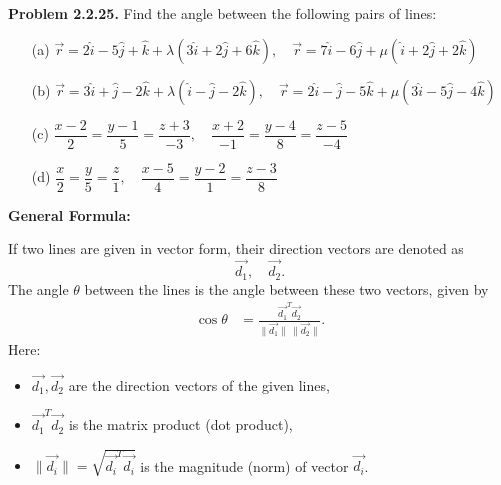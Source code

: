 \documentclass[12pt]{article}
\begin{document}
\textbf{Problem 2.2.25.} Find the angle between the following pairs of lines:

\begin{enumerate}
\item[(a)] 
$\vec{r} = 2\hat i - 5\hat j + \hat k + \lambda(3\hat i + 2\hat j + 6\hat k), 
\quad
\vec{r} = 7\hat i - 6\hat j + \mu(\hat i + 2\hat j + 2\hat k)$

\item[(b)] 
$\vec{r} = 3\hat i + \hat j - 2\hat k + \lambda(\hat i - \hat j - 2\hat k), 
\quad 
\vec{r} = 2\hat i - \hat j - 5\hat k + \mu(3\hat i - 5\hat j - 4\hat k)$

\item[(c)] 
$\dfrac{x-2}{2} = \dfrac{y-1}{5} = \dfrac{z+3}{-3}, 
\quad 
\dfrac{x+2}{-1} = \dfrac{y-4}{8} = \dfrac{z-5}{-4}$

\item[(d)] 
$\dfrac{x}{2} = \dfrac{y}{5} = \dfrac{z}{1}, 
\quad 
\dfrac{x-5}{4} = \dfrac{y-2}{1} = \dfrac{z-3}{8}$
\end{enumerate}

\textbf{General Formula:}  

If two lines are given in vector form, their direction vectors are denoted as
$$
\vec{d_1}, \quad \vec{d_2}.
$$
The angle $\theta$ between the lines is the angle between these two vectors, given by
\begin{align}
\cos \theta &= \frac{\vec{d_1}^T \vec{d_2}}{\|\vec{d_1}\| \, \|\vec{d_2}\|}.
\end{align}
Here:
\begin{itemize}
    \item $\vec{d_1}, \vec{d_2}$ are the direction vectors of the given lines,
    \item $\vec{d_1}^T \vec{d_2}$ is the matrix product (dot product),
    \item $\|\vec{d_i}\| = \sqrt{\vec{d_i}^T \vec{d_i}}$ is the magnitude (norm) of vector $\vec{d_i}$.
\end{itemize}
\end{document}
